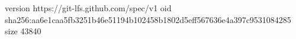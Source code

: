 version https://git-lfs.github.com/spec/v1
oid sha256:aa6e1caa5fb3251b46e51194b102458b1802d5eff567636e4a397c9531084285
size 43840
